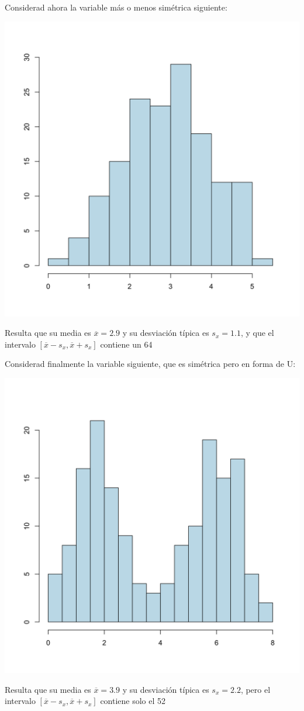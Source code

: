 \documentclass[
]{book}
\theoremstyle{definition}
\theoremstyle{definition}
\theoremstyle{definition}
\theoremstyle{definition}
\theoremstyle{remark}
\begin{document}
Considerad ahora la variable más o menos simétrica siguiente:


\begin{center}\includegraphics[width=0.6\linewidth]{INREMDN_files/figure-html/sim} \end{center}

Resulta que su media es $\overline{x}=2.9$ y su desviación típica es $s_x=1.1$, y que el intervalo $[\overline{x}-s_x,\overline{x}+s_x]$ contiene un 64%

Considerad finalmente la variable siguiente, que es simétrica pero en forma de U:


\begin{center}\includegraphics[width=0.6\linewidth]{INREMDN_files/figure-html/usim} \end{center}

Resulta que su media es $\overline{x}=3.9$ y su desviación típica es $s_x=2.2$, pero el intervalo $[\overline{x}-s_x,\overline{x}+s_x]$ contiene solo el 52%
\end{document}
